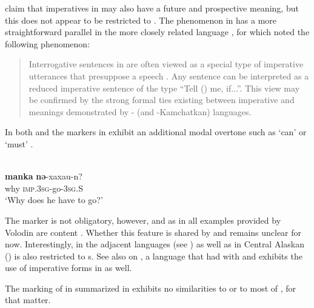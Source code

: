 \citet[171]{GeorgVolodin1999} claim that imperatives in  may also have a future and prospective meaning, but this does not appear to be restricted to . The phenomenon in  has a more straightforward parallel in the more closely related language , for which \citet[158]{Volodin2001} noted the following phenomenon:

\begin{quote}
Interrogative sentences in  are often viewed as a special type of imperative utterances that presuppose a speech . Any  sentence can be interpreted as a reduced imperative sentence of the type “Tell () me, if...”. This view may be confirmed by the strong formal ties existing between imperative and  meanings demonstrated by - (and -Kamchatkan) languages.
\end{quote}

\noindent In both  and  the  markers in  exhibit an additional modal overtone such as ‘can’ or ‘must’ \citep[157]{Volodin2001}.

\ea%
    \label{ex:chuk:11}
    \\
    \gll \textbf{{manka}} \textbf{{nə}}-xaxau-n?\\
    why    \textsc{imp}.3\textsc{sg}-go-3\textsc{sg}.S\\
    \glt ‘Why does he have to go?’ \citep[156]{Volodin2001}
    \z

\noindent The  marker is not obligatory, however, and as in  all examples provided by Volodin are content . Whether this feature is shared by  and  remains unclear for now. Interestingly,   in the adjacent  languages (see ) as well as in Central Alaskan  () is also restricted to s. See also  on , a  language that had  with  and exhibits the use of imperative forms in  as well.

The marking of  in  summarized in  exhibits no similarities to  or to most of , for that matter.

